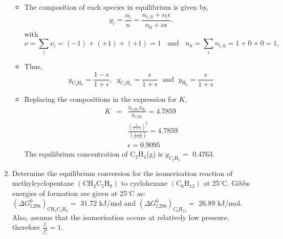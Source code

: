 \documentclass[12pts,a4paper,amsmath,amssymb,floatfix]{article}%
\newcommand{\frc}{\displaystyle\frac}
\newcounter{reaction}
\begin{document}
\begin{enumerate}[1)]
\begin{itemize}
      \item The composition of each species in equilibrium is given by,
         \begin{displaymath}
           y_{i} = \frc{n_{i}}{n} = \frc{n_{i,0}+\nu_{i}\epsilon}{n_{0}+\nu\epsilon}.
         \end{displaymath}
         with 
         \begin{displaymath}
            \nu = \sum\limits_{i}\nu_{i}= (-1)+(+1)+(+1)= 1 \;\;\text{ and }\;\; n_{0} = \sum\limits_{i}n_{i,0}= 1 + 0 + 0 = 1,
         \end{displaymath} 
      \item Thus,
         \begin{displaymath}
             y_{\text{C}_{2}\text{H}_{6}} = \frc{1-\epsilon}{1+\epsilon},\;\;y_{\text{C}_{2}\text{H}_{4}} = \frc{\epsilon}{1+\epsilon}\;\text{ and }\;y_{\text{H}_{2}} = \frc{\epsilon}{1+\epsilon}
         \end{displaymath}
      \item Replacing the compositions in the expression for $K$,
         \begin{eqnarray}
            K  &=& \frc{y_{\text{C}_{2}\text{H}_{4}} y_{\text{H}_{2}}}{y_{\text{C}_{2}\text{H}_{6}}} = 4.7859 \nonumber \\
               &&  \frc{\left(\frc{\epsilon}{1+\epsilon}\right)^{2}}{\left(\frc{1-\epsilon}{1+\epsilon}\right)} =4.7859 \nonumber \\
            &&\epsilon = 0.9095 \nonumber
         \end{eqnarray}
        The equilibrium concentration of C$_{2}$H$_{4}$(g) is $y_{\text{C}_{2}\text{H}_{4}} =$ 0.4763.

   \end{itemize}
\clearpage


\item\label{Example:3} Determine the equilibrium conversion for the isomerisation reaction of methylcyclopentane $\left(\text{CH}_{3}\text{C}_{5}\text{H}_{9}\right)$ to cyclohexane $\left(\text{C}_{6}\text{H}_{12}\right)$ at 25$^{\circ}$C. Gibbs energies of formation are given at 25$^{\circ}$C as: \\
$\left(\Delta G^{0}_{\text{f,298}}\right)_{\text{CH}_{3}\text{C}_{5}\text{H}_{9}} =$ 31.72 kJ/mol and $\left(\Delta G^{0}_{\text{f,298}}\right)_{\text{C}_{6}\text{H}_{12}} = $ 26.89 kJ/mol. Also, assume that the isomerisation occurs at relatively low pressure, therefore $\frc{f_{i}}{f^{0}_{i}}=1$.



\end{enumerate}
\end{document}

